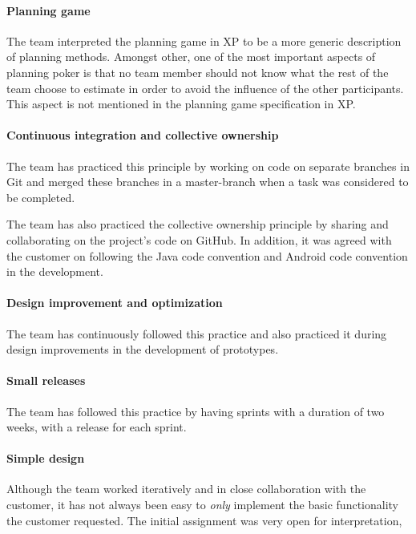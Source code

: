 \paragraph{Planning game}
The team interpreted the planning game in XP to be a more generic description of planning methods.  Amongst other, one of the most important aspects of planning poker is that no team member should not know what the rest of the team choose to estimate in order to avoid the influence of the other participants. This aspect is not mentioned in the planning game specification in XP.

\paragraph{Continuous integration and collective ownership}
The team has practiced this principle by working on code on separate branches in Git and merged these branches in a master-branch when a task was considered to be completed.

The team has also practiced the collective ownership principle by sharing and collaborating on the project's code on GitHub. In addition, it was agreed with the customer on following the Java code convention and Android code convention in the development.

\paragraph{Design improvement and optimization}
The team has continuously followed this practice and also practiced it during design improvements in the development of prototypes.
 
\paragraph{Small releases}
The team has followed this practice by having sprints with a duration of two weeks, with a release for each sprint.


\paragraph{Simple design}
Although the team worked iteratively and in close collaboration with the customer, it has not always been easy to \emph{only} implement the basic functionality the customer requested. The initial assignment was very open for interpretation,  

